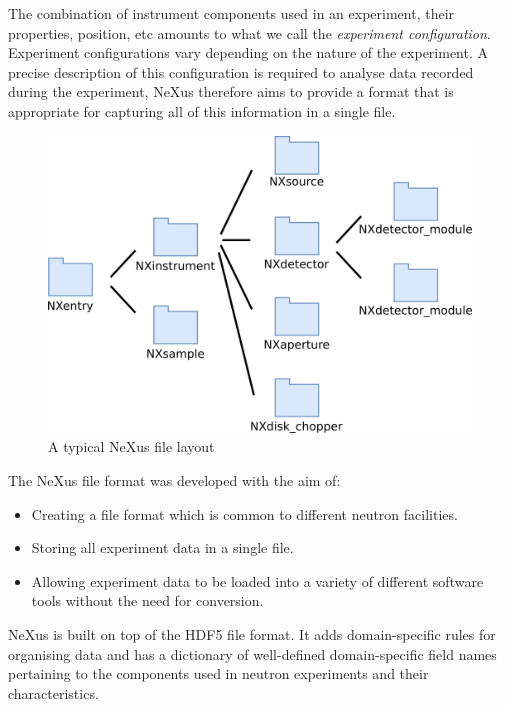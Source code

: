 The combination of instrument components used in an experiment, their properties, position, etc amounts to what we call the \textit{experiment configuration}. Experiment configurations vary depending on the nature of the experiment. A precise description of this configuration is required to analyse data recorded during the experiment, NeXus therefore aims to provide a format that is appropriate for capturing all of this information in a single file.


\begin{figure}
\begin{center}
\includegraphics[width=0.8\linewidth]{instrument_arch.png}
\end{center}
\caption{A typical NeXus file layout}
\end{figure}
The NeXus file format was developed with the aim of:
\begin{itemize}
\item Creating a file format which is common to different neutron facilities.
\item Storing all experiment data in a single file.
\item Allowing experiment data to be loaded into a variety of different software tools without the need for conversion.
\end{itemize}
\smallskip
NeXus is built on top of the HDF5 file format. It adds domain-specific rules for organising data and has a dictionary of well-defined domain-specific field names pertaining to the components used in neutron experiments and their characteristics.

